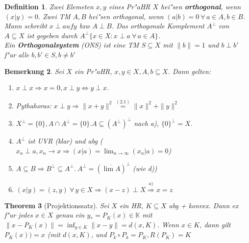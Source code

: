 \documentclass[a4paper,11pt]{book}
\newcommand{\K}{{\mathbb K}}
\newcommand{\begriff}[1]{\textbf{#1}} %
\newtheorem{Def}{Definition}[chapter]
\newtheorem{Theo}[Def]{Theorem}
\newtheorem{Bem}[Def]{Bemerkung}
\theoremstyle{nonumberplain}
\begin{document}
\begin{Def}
Zwei Elemeten $x,y$ eines Pr"aHR $X$ hei"sen \begriff{orthogonal}, wenn $(x|y) = 0$. Zwei TM $A,B$ hei"sen orthogonal, wenn $(a|b) = 0 \ \forall\, a \in A, b \in B$. Mann schreibt $x \perp auf y$ bzw $A \perp B$. Das orthogonale Komplement $A^{\perp}$ von $A \subseteq X$ ist gegeben durch $A^{\perp} \{ x \in X: x \perp a \ \forall\, a \in A \}$.\\
Ein \begriff{Orthogonalsystem} (ONS) ist eine TM $S \subseteq X$ mit $\|b\| = 1$ und $b \perp b'$ f"ur alle $b,b' \in S, b \not= b'$
\end{Def}

\begin{Bem}
Sei $X$ ein Pr"aHR, $x,y \in X, A,b \subseteq X$. Dann gelten:
\begin{enumerate}
\item $x \perp x \Rightarrow x = 0, x \perp y \Leftrightarrow y \perp x$.

\item Pythahoras: $x \perp y \Rightarrow \|x+y\|^2 \stackrel{(2.1)}{=} \|x\|^2 + \|y\|^2$

\item $X^{\perp} = \{0\}, A \cap A^{\perp} = \{0\}. A \subseteq (A^{\perp})^{\perp}$ nach a), $\{0\}^{\perp} = X.$

\item $A^{\perp}$ ist UVR (klar) und abg ($x_n \perp a, x_n \rightarrow x \Rightarrow (x|a) = \lim_{n \rightarrow \infty} (x_n|a) = 0$)

\item $A \subseteq B \Rightarrow B^{\perp} \subseteq A^{\perp}.\ A^{\perp} = (\overline{\lim A})^{\perp}$ (wie d))

\item $(x|y) = (z,y) \ \forall\, y \in X \Rightarrow (x-z) \perp X \stackrel{a)}{\Rightarrow} x = z$
\end{enumerate}
\end{Bem}

\begin{Theo}[Projektionssatz]
Sei $X$ ein HR, $K \subseteq X$ abg + konvex. Dann ex f"ur jedes $x \in X$ genau ein $y_{\ast} = P_K(x) \in \K$ mit $\| x - P_K(x) \| = \inf_{y \in K} \|x-y\| = d(x,K)$. Wenn $x \in K$, dann gilt $P_K(x) ) = x$ (mit $d(x,K)$, und $P_k \circ P_k = P_K, R(P_K) = K$
\end{Theo}
\end{document}
